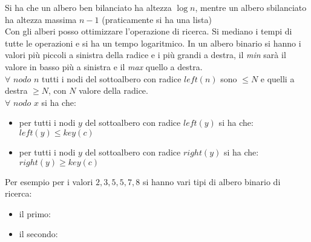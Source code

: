 \documentclass[a4paper,12pt,oneside,tikz]{book}
\begin{document}
Si ha che un albero ben bilanciato ha altezza $\log n$, mentre un albero sbilanciato ha altezza massima $n-1$ (praticamente si ha una lista)\\
Con gli alberi posso ottimizzare l'operazione di ricerca. Si mediano i tempi di tutte le operazioni e si ha un tempo logaritmico. In un albero binario si hanno i valori più piccoli a sinistra della radice e i più grandi a destra, il \textit{min} sarà il valore in basso più a sinistra e il \textit{max} quello a destra.\\ $\forall	\,\, nodo\,\, n$ tutti i nodi del sottoalbero con radice $left(n)$ sono $\leq N$ e quelli a destra $\geq N$, con $N$ valore della radice.\\
$\forall \,\, nodo \,\, x$ si ha che:
\begin{itemize}
	\item per tutti i nodi $y$ del sottoalbero con radice $left(y)$ si ha che: $left(y)\leq key(c)$
	\item per tutti i nodi $y$ del sottoalbero con radice $right(y)$ si ha che: $right(y)\geq key(c)$
\end{itemize}
Per esempio per i valori $2,3,5,5,7,8$ si hanno vari tipi di albero binario di ricerca:
\begin{itemize}
	\item il primo:
	      \begin{center}
	      \end{center}
	\item il secondo:
	      \begin{center}
	      \end{center}
\end{itemize}
\end{document}
